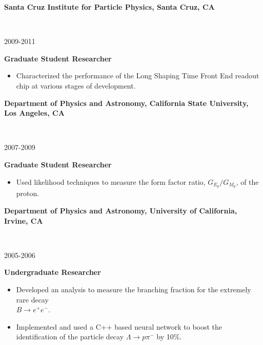 \documentclass[11pt]{article}
\newcommand{\experienceentry}[5] { 
    \noindent
    \begin{minipage}[t]{0.84\textwidth} 
      \textbf{#1, #2}
    \end{minipage} \\[0.01pt]
    \begin{minipage}[t]{0.15\textwidth} \begin{flushright} #3 \end{flushright} \end{minipage} \hspace{0.01\textwidth}
    \begin{minipage}[t]{0.84\textwidth} 
      \textbf{\textcolor{indigodye}{#4}} \vspace{5pt} %
    \end{minipage} 
    #5 \vspace{11pt}
}
\begin{document}
                      \newpage
        \experienceentry{Santa Cruz Institute for Particle Physics}{Santa Cruz, CA}
                        {2009-2011}
                        {Graduate Student Researcher}
                        {
            \begin{itemize}[label=\textcolor{indigodye}{$\circ$}, noitemsep, nolistsep, leftmargin=0.19\textwidth]
                \item Characterized the performance of the Long Shaping Time Front End readout chip at
                      various stages of development.
            \end{itemize}
                        } 
        \experienceentry{Department of Physics and Astronomy, California State University, Los Angeles}
                        {CA}
                        {2007-2009}
                        {Graduate Student Researcher}
                        {
            \begin{itemize}[label=\textcolor{indigodye}{$\circ$}, noitemsep, nolistsep, leftmargin=0.19\textwidth]
                \item Used likelihood techniques to measure the form factor ratio, $G_{E_p}/G_{M_p}$, of
                      the proton.
            \end{itemize}
                        }  
        \experienceentry{Department of Physics and Astronomy, University of California, Irvine}
                        {CA}
                        {2005-2006}
                        {Undergraduate Researcher}
                        { 
            \begin{itemize}[label=\textcolor{indigodye}{$\circ$}, noitemsep, nolistsep, leftmargin=0.19\textwidth]
                \item Developed an analysis to measure the branching fraction for the extremely rare decay \\ 
                      $B\rightarrow e^+e^-$.
                \item Implemented and used a C++ based neural network to boost the identification of 
                      the particle decay $\Lambda \rightarrow p \pi^-$ by 10\%.
            \end{itemize}
                       } 
\end{document}
